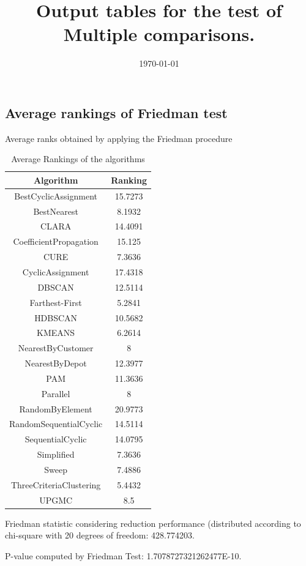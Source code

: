 \documentclass[a4paper,10pt]{article}
\title{Output tables for the test of Multiple comparisons.}
\author{}
\date{\today}
\begin{document}
\begin{landscape}
\pagestyle{empty}
\maketitle
\thispagestyle{empty}
\section{Average rankings of Friedman test}



Average ranks obtained by applying the Friedman procedure

\begin{table}[!htp]
\centering
\begin{tabular}{|c|c|}\hline
Algorithm&Ranking\\\hline
BestCyclicAssignment & 15.7273\\
BestNearest & 8.1932\\
CLARA & 14.4091\\
CoefficientPropagation & 15.125\\
CURE & 7.3636\\
CyclicAssignment & 17.4318\\
DBSCAN & 12.5114\\
Farthest-First & 5.2841\\
HDBSCAN & 10.5682\\
KMEANS & 6.2614\\
NearestByCustomer & 8\\
NearestByDepot & 12.3977\\
PAM & 11.3636\\
Parallel & 8\\
RandomByElement & 20.9773\\
RandomSequentialCyclic & 14.5114\\
SequentialCyclic & 14.0795\\
Simplified & 7.3636\\
Sweep & 7.4886\\
ThreeCriteriaClustering & 5.4432\\
UPGMC & 8.5\\
\hline
\end{tabular}
\caption{Average Rankings of the algorithms}
\end{table}

Friedman statistic considering reduction performance (distributed according to chi-square with 20 degrees of freedom: 428.774203.

P-value computed by Friedman Test: 1.7078727321262477E-10.\newline


\end{landscape}
\end{document}
